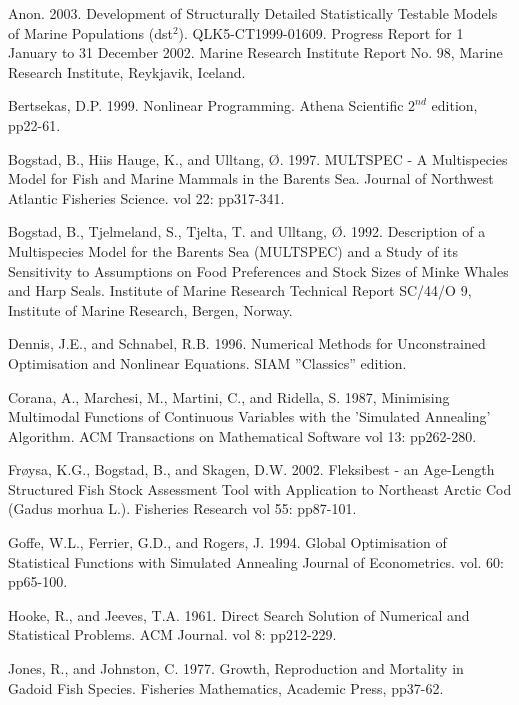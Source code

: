 \documentclass[10pt,twoside]{book}
\begin{document}
Anon. 2003. Development of Structurally Detailed Statistically Testable Models of Marine Populations (dst$^{2}$). QLK5-CT1999-01609. Progress Report for 1 January to 31 December 2002. Marine Research Institute Report No. 98, Marine Research Institute, Reykjavik, Iceland.\newline

Bertsekas, D.P. 1999. Nonlinear Programming. Athena Scientific $2^{nd}$ edition, pp22-61.\newline

Bogstad, B., Hiis Hauge, K., and Ulltang, {\O}. 1997. MULTSPEC - A Multispecies Model for Fish and Marine Mammals in the Barents Sea. Journal of Northwest Atlantic Fisheries Science. vol 22: pp317-341.\newline

Bogstad, B., Tjelmeland, S., Tjelta, T. and Ulltang, {\O}. 1992. Description of a Multispecies Model for the Barents Sea (MULTSPEC) and a Study of its Sensitivity to Assumptions on Food Preferences and Stock Sizes of Minke Whales and Harp Seals. Institute of Marine Research Technical Report SC/44/O 9, Institute of Marine Research, Bergen, Norway.\newline

Dennis, J.E., and Schnabel, R.B. 1996. Numerical Methods for Unconstrained Optimisation and Nonlinear Equations.  SIAM ''Classics'' edition.\newline

Corana, A., Marchesi, M., Martini, C., and Ridella, S. 1987, Minimising Multimodal Functions of Continuous Variables with the 'Simulated Annealing' Algorithm. ACM Transactions on Mathematical Software vol 13: pp262-280.\newline

Fr{\o}ysa, K.G., Bogstad, B., and Skagen, D.W. 2002. Fleksibest - an Age-Length Structured Fish Stock Assessment Tool with Application to Northeast Arctic Cod (Gadus morhua L.). Fisheries Research vol 55: pp87-101.\newline

Goffe, W.L., Ferrier, G.D., and Rogers, J. 1994. Global Optimisation of Statistical Functions with Simulated Annealing Journal of Econometrics. vol. 60: pp65-100.\newline

Hooke, R., and Jeeves, T.A. 1961. Direct Search Solution of Numerical and Statistical Problems. ACM Journal. vol 8: pp212-229.\newline

Jones, R., and Johnston, C. 1977. Growth, Reproduction and Mortality in Gadoid Fish Species. Fisheries Mathematics, Academic Press, pp37-62.\newline
\end{document}
